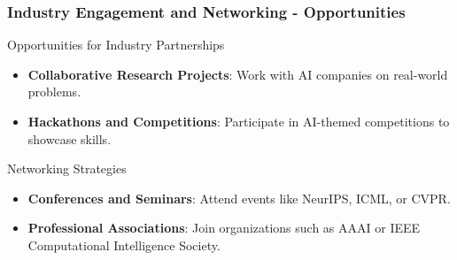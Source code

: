 \documentclass{beamer}
\begin{document}
\begin{frame}[fragile]
    \frametitle{Industry Engagement and Networking - Opportunities}
    \begin{block}{Opportunities for Industry Partnerships}
        \begin{itemize}
            \item \textbf{Collaborative Research Projects}: Work with AI companies on real-world problems.
            \item \textbf{Hackathons and Competitions}: Participate in AI-themed competitions to showcase skills.
        \end{itemize}
    \end{block}
    
    \begin{block}{Networking Strategies}
        \begin{itemize}
            \item \textbf{Conferences and Seminars}: Attend events like NeurIPS, ICML, or CVPR.
            \item \textbf{Professional Associations}: Join organizations such as AAAI or IEEE Computational Intelligence Society.
        \end{itemize}
    \end{block}
\end{frame}
\end{document}
